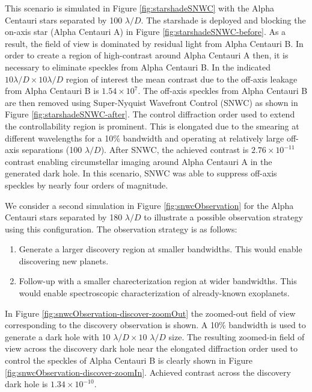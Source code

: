 \documentclass[]{spie}  %
\begin{document}
This scenario is simulated in Figure \ref{fig:starshadeSNWC} with the Alpha Centauri stars separated by 100 $\lambda/D$. The starshade is deployed and blocking the on-axis star (Alpha Centauri A) in Figure \ref{fig:starshadeSNWC-before}. As a result, the field of view is dominated by residual light from Alpha Centauri B. In order to create a region of high-contrast around Alpha Centauri A then, it is necessary to eliminate speckles from Alpha Centauri B. In the indicated $10 \lambda/D \times 10 \lambda/D$ region of interest the mean contrast due to the off-axis leakage from Alpha Centauri B  is $1.54 \times 10^{7}$. The off-axis speckles from Alpha Centauri B are then removed using Super-Nyquist Wavefront Control (SNWC) as shown in Figure \ref{fig:starshadeSNWC-after}. The control diffraction order used to extend the controllability region is prominent. This is elongated due to the smearing at different wavelengths for a 10\% bandwidth and operating at relatively large off-axis separations (100 $\lambda/D$). After SNWC, the achieved contrast is $2.76 \times 10^{-11}$ contrast enabling circumstellar imaging around Alpha Centauri A in the generated dark hole. In this scenario, SNWC was able to suppress off-axis speckles by nearly four orders of magnitude.

We consider a second simulation in Figure \ref{fig:snwcObservation} for the Alpha Centauri stars separated by 180 $\lambda/D$ to illustrate a possible observation strategy using this configuration. The observation strategy is as follows:
\begin{enumerate}
\item Generate a larger discovery region at smaller bandwidths. This would enable discovering new planets.
\item Follow-up with a smaller charecterization region at wider bandwidths. This would enable spectroscopic characterization of already-known exoplanets.
\end{enumerate}
In Figure \ref{fig:snwcObservation-discover-zoomOut} the zoomed-out field of view corresponding to the discovery observation is shown. A 10\% bandwidth is used to generate a dark hole with 10 $\lambda/D \times 10$ $\lambda/D$ size. The resulting zoomed-in field of view across the discovery dark hole near the elongated diffraction order used to control the speckles of Alpha Centauri B is clearly shown in Figure \ref{fig:snwcObservation-discover-zoomIn}. Achieved contrast across the discovery dark hole is $1.34 \times 10^{-10}$. 
\end{document}
